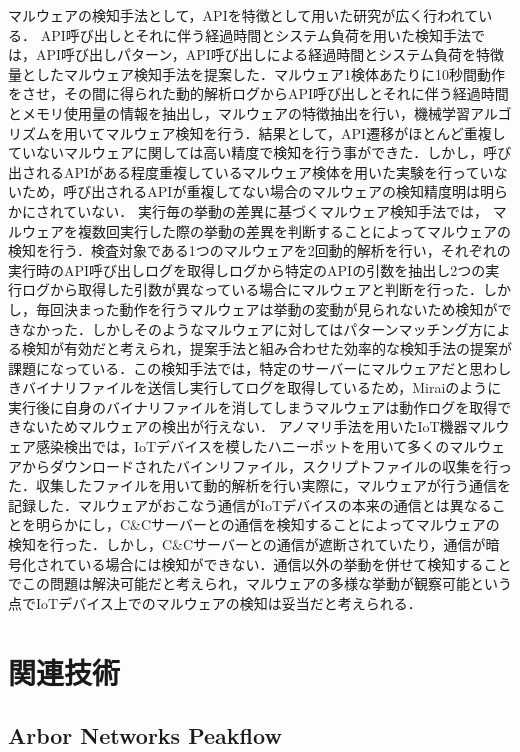 マルウェアの検知手法として，APIを特徴として用いた研究が広く行われている．
API呼び出しとそれに伴う経過時間とシステム負荷を用いた検知手法\cite{パターン}では，API呼び出しパターン，API呼び出しによる経過時間とシステム負荷を特徴量としたマルウェア検知手法を提案した．マルウェア1検体あたりに10秒間動作をさせ，その間に得られた動的解析ログからAPI呼び出しとそれに伴う経過時間とメモリ使用量の情報を抽出し，マルウェアの特徴抽出を行い，機械学習アルゴリズムを用いてマルウェア検知を行う．結果として，API遷移がほとんど重複していないマルウェアに関しては高い精度で検知を行う事ができた．しかし，呼び出されるAPIがある程度重複しているマルウェア検体を用いた実験を行っていないため，呼び出されるAPIが重複してない場合のマルウェアの検知精度明は明らかにされていない．
実行毎の挙動の差異に基づくマルウェア検知手法\cite{挙動の差異}では，
マルウェアを複数回実行した際の挙動の差異を判断することによってマルウェアの検知を行う．検査対象である1つのマルウェアを2回動的解析を行い，それぞれの実行時のAPI呼び出しログを取得しログから特定のAPIの引数を抽出し2つの実行ログから取得した引数が異なっている場合にマルウェアと判断を行った．しかし，毎回決まった動作を行うマルウェアは挙動の変動が見られないため検知ができなかった．しかしそのようなマルウェアに対してはパターンマッチング方による検知が有効だと考えられ，提案手法と組み合わせた効率的な検知手法の提案が課題になっている．この検知手法では，特定のサーバーにマルウェアだと思わしきバイナリファイルを送信し実行してログを取得しているため，Miraiのように実行後に自身のバイナリファイルを消してしまうマルウェアは動作ログを取得できないためマルウェアの検出が行えない．
アノマリ手法を用いたIoT機器マルウェア感染検出\cite{アノマリ}では，IoTデバイスを模したハニーポットを用いて多くのマルウェアからダウンロードされたバインリファイル，スクリプトファイルの収集を行った．収集したファイルを用いて動的解析を行い実際に，マルウェアが行う通信を記録した．マルウェアがおこなう通信がIoTデバイスの本来の通信とは異なることを明らかにし，C\&Cサーバーとの通信を検知することによってマルウェアの検知を行った．しかし，C\&Cサーバーとの通信が遮断されていたり，通信が暗号化されている場合には検知ができない．通信以外の挙動を併せて検知することでこの問題は解決可能だと考えられ，マルウェアの多様な挙動が観察可能という点でIoTデバイス上でのマルウェアの検知は妥当だと考えられる．

\section{関連技術}

\subsection{Arbor Networks Peakflow\cite{Arbor}}


